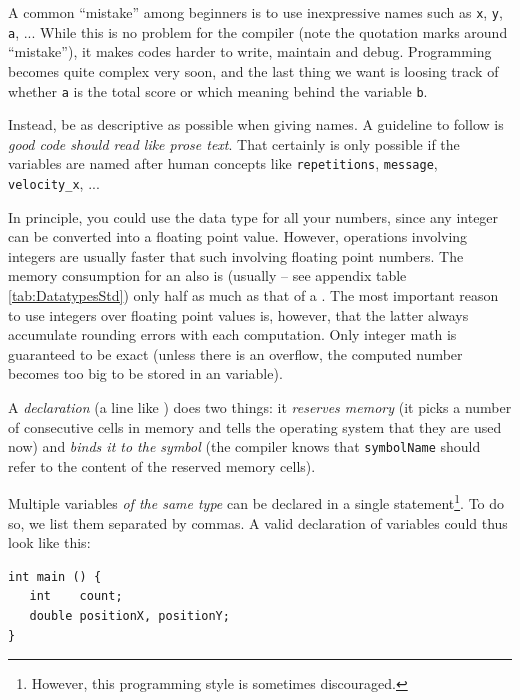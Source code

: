 \begin{hintbox}
A common \enquote{mistake} among beginners is to use inexpressive names such as \texttt{x}, \texttt{y}, \texttt{a}, ... While this is no problem for the compiler (note the quotation marks around \enquote{mistake}), it makes codes harder to write, maintain and debug. Programming becomes quite complex very soon, and the last thing we want is loosing track of whether \texttt{a} is the total score or which meaning behind the variable \texttt{b}.

Instead, be as descriptive as possible when giving names. A guideline to follow is \emph{good code should read like prose text}. That certainly is only possible if the variables are named after human concepts like \texttt{repetitions}, \texttt{message}, \texttt{velocity\_x}, ...
\end{hintbox}

\begin{hintbox}
In principle, you could use the data type  for all your numbers, since any integer can be converted into a floating point value. However, operations involving integers are usually faster that such involving floating point numbers. The memory consumption for an  also is (usually -- see appendix table \ref{tab:DatatypesStd}) only half as much as that of a . The most important reason to use integers over floating point values is, however, that the latter always accumulate rounding errors with each computation. Only integer math is guaranteed to be exact (unless there is an overflow, \ie the computed number becomes too big to be stored in an  variable).
\end{hintbox}

A \emph{declaration} (\ie a line like ) does two things: it \emph{reserves memory} (\ie it picks a number of consecutive cells in memory and tells the operating system that they are used now) and \emph{binds it to the symbol} (\ie the compiler knows that \texttt{symbolName} should refer to the content of the reserved memory cells).

Multiple variables \emph{of the same type} can be declared in a single statement\footnote{However, this programming style is sometimes discouraged.}. To do so, we list them separated by commas. A valid declaration of variables could thus look like this:
\begin{codebox}[declarations.c]
\begin{verbatim}
int main () {
   int    count;
   double positionX, positionY;
}
\end{verbatim}
 \label{code:declaringVars}
\end{codebox}

